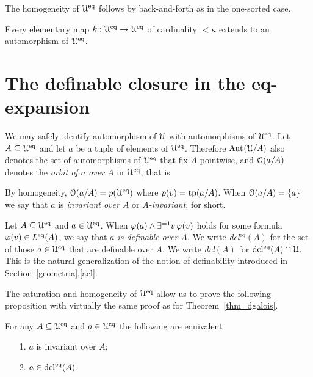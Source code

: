 \documentclass[creche.tex]{subfiles}
\begin{document}
The homogeneity of $\EuScript U^{{\rm eq}}$ follows by back-and-forth as in the one-sorted case.

\begin{proposition}\label{prop_Ueq_homogeneous}
Every elementary map $k:\EuScript U^{{\rm eq}}\to\EuScript U^{{\rm eq}}$ of cardinality $<\kappa$ extends to an automorphism of $\EuScript U^{{\rm eq}}$.\QED
\end{proposition} 

\section{The definable closure in the eq-expansion}
We may safely identify automorphism of $\EuScript U$ with automorphisms of $\EuScript U^{{\rm eq}}$.
Let $A\subseteq\EuScript U^{{\rm eq}}$ and let $a$ be a tuple of elements of $\EuScript U^{{{\rm eq}}}$.
Therefore \emph{$\textrm{Aut\kern.15ex}(\EuScript U/A)$\/} also denotes the set of automorphisms of $\EuScript U^{{\rm eq}}$ that fix $A$ pointwise, and \emph{$\EuScript O(a/A)$\/} denotes the \emph{orbit of $a$ over $A$\/} in  $\EuScript U^{{\rm eq}}$, that is


By homogeneity, $\EuScript O(a/A)=p(\EuScript U^{{\rm eq}})$ where $p(v)={\rm tp}(a/A)$.
When $\EuScript O(a/A)=\{a\}$ we say that $a$ is \emph{invariant over $A$\/} or \emph{$A$-invariant}, for short.


\begin{definition}\label{def_def}
Let $A\subseteq\EuScript U^{{\rm eq}}$ and $a\in\EuScript U^{{\rm eq}}$.
When $\varphi(a)\wedge\exists^{=1}v\,\varphi(v)$ holds for some formula $\varphi(v)\in L^{{\rm eq}}(A)$, we say that \emph{$a$ is definable over $A$}.
We write \emph{dcl$^\textrm{eq}(A)$\/} for the set of those $a\in\EuScript U^{{\rm eq}}$ that are definable over $A$.
We write \emph{dcl$(A)$\/} for $\mathop{\rm dcl}^{{\rm eq}}(A)\cap\EuScript U$.
This is the natural generalization of the notion of definability introduced in Section~\hyperref[acl]{\ref*{geometria}.\ref*{acl}}.\QED
\end{definition}

The saturation and homogeneity of $\EuScript U^{{\rm eq}}$ allow us to prove the following proposition with virtually the same proof as for Theorem~\ref{thm_dgalois}.

\begin{theorem}\label{thm_Galois_def=def}
For any $A\subseteq\EuScript U^{{\rm eq}}$ and $a\in\EuScript U^{{\rm eq}}$ the following are equivalent
\begin{itemize}
\item[1.] $a$ is invariant over $A$;
\item[2.] $a\in\mathop{\rm dcl}^{{\rm eq}}(A)$.\QED
\end{itemize}
\end{theorem}
\end{document}
